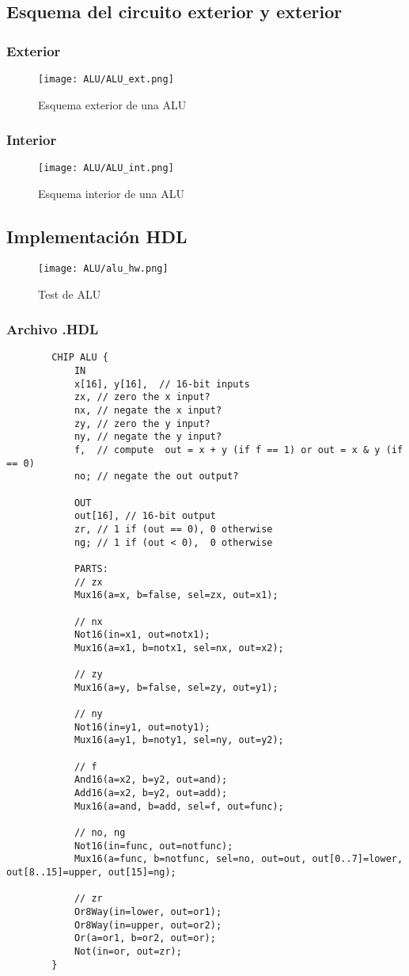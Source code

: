 \documentclass[12pt]{article}
\begin{document}
	\subsection{Esquema del circuito exterior y exterior}
	\subsubsection{Exterior}
	\begin{figure}[H]
		\centering
		\texttt{[image: ALU/ALU\_ext.png]}
		\caption{Esquema exterior de una ALU}
		\label{fig:Inc16}
	\end{figure}
	\subsubsection{Interior}
	\begin{figure}[H]
		\centering
		\texttt{[image: ALU/ALU\_int.png]}
		\caption{Esquema interior de una ALU}
		\label{fig:f_Inc16}
	\end{figure}
	\subsection{Implementación HDL}
	\begin{figure}[H]
		\centering
		\texttt{[image: ALU/alu\_hw.png]}
		\caption{Test de ALU}
		\label{fig:enter-label}
	\end{figure}
	\subsubsection{Archivo .HDL}
	\begin{lstlisting}
		CHIP ALU {
			IN
			x[16], y[16],  // 16-bit inputs
			zx, // zero the x input?
			nx, // negate the x input?
			zy, // zero the y input?
			ny, // negate the y input?
			f,  // compute  out = x + y (if f == 1) or out = x & y (if == 0)
			no; // negate the out output?

			OUT
			out[16], // 16-bit output
			zr, // 1 if (out == 0), 0 otherwise
			ng; // 1 if (out < 0),  0 otherwise

			PARTS:
			// zx
			Mux16(a=x, b=false, sel=zx, out=x1);

			// nx
			Not16(in=x1, out=notx1);
			Mux16(a=x1, b=notx1, sel=nx, out=x2);

			// zy
			Mux16(a=y, b=false, sel=zy, out=y1);

			// ny
			Not16(in=y1, out=noty1);
			Mux16(a=y1, b=noty1, sel=ny, out=y2);

			// f
			And16(a=x2, b=y2, out=and);
			Add16(a=x2, b=y2, out=add);
			Mux16(a=and, b=add, sel=f, out=func);

			// no, ng
			Not16(in=func, out=notfunc);
			Mux16(a=func, b=notfunc, sel=no, out=out, out[0..7]=lower, out[8..15]=upper, out[15]=ng);

			// zr
			Or8Way(in=lower, out=or1);
			Or8Way(in=upper, out=or2);
			Or(a=or1, b=or2, out=or);
			Not(in=or, out=zr);
		}
	\end{lstlisting}
\end{document}
